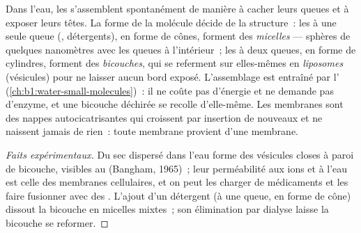 \begin{proposition}\label{prop:b1:lipids:selfassembly}
Dans l'eau, les  s'assemblent spontanément de
manière à cacher leurs queues et à exposer leurs têtes. La forme de la
molécule décide de la structure~: les  à une seule queue (, détergents), en forme de cônes, forment des \emph{micelles} ---
sphères de quelques nanomètres avec les queues à l'intérieur~; les
 à deux queues, en forme de cylindres, forment des
\emph{bicouches}, qui se referment sur elles-mêmes en
\emph{liposomes} (vésicules) pour ne laisser aucun bord exposé.
L'assemblage est entraîné par l'
(\cref{ch:b1:water-small-molecules})~: il ne coûte pas d'énergie et ne
demande pas d'enzyme, et une bicouche déchirée se recolle d'elle-même.
Les membranes sont des nappes autocicatrisantes qui croissent par
insertion de  nouveaux et ne naissent jamais de rien~: toute
membrane provient d'une membrane.
\end{proposition}
\begin{proof}[Faits expérimentaux]
Du  sec dispersé dans l'eau forme des vésicules closes à
paroi de bicouche, visibles au  (Bangham,
1965)~; leur perméabilité aux ions et à l'eau est celle des membranes
cellulaires, et on peut les charger de médicaments et les faire
fusionner avec des . L'ajout d'un détergent (à une queue, en
forme de cône) dissout la bicouche en micelles mixtes~; son élimination
par dialyse laisse la bicouche se reformer.
\end{proof}

